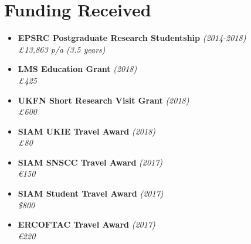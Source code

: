 \documentclass[10pt,a4paper,sans]{moderncv}        %
\begin{document}
	\section{Funding Received}
	\begin{multicols}{2}
		
		\vspace{6pt}
		
		\begin{itemize}
			
			\item \textbf{EPSRC Postgraduate Research Studentship} \textit{(2014-2018)} \\
			\textit{£13,863 p/a (3.5 years)}
			
			\vspace{6pt}
			
			\item \textbf{LMS Education Grant} \textit{(2018)}\\
			\textit{£425}
			
			\vspace{6pt}
			
			\item \textbf{UKFN Short Research Visit Grant} \textit{(2018)}\\
			\textit{£600}
			
			\vspace{2pt}
			
			\item \textbf{SIAM UKIE Travel Award} \textit{(2018)}\\
			\textit{£80}
			
			\vspace{2pt}
			
			\item \textbf{SIAM SNSCC Travel Award} \textit{(2017)}\\
			\textit{\euro{}150}
			
			\vspace{2pt}
			
			\item \textbf{SIAM Student Travel Award} \textit{(2017)}\\
			\textit{\$800}
			
			\vspace{6pt}
			
			\item \textbf{ERCOFTAC Travel Award} \textit{(2017)}\\
			\textit{\euro{}220}
			
			\vspace{6pt}
			

\end{itemize}
\end{multicols}
\end{document}
